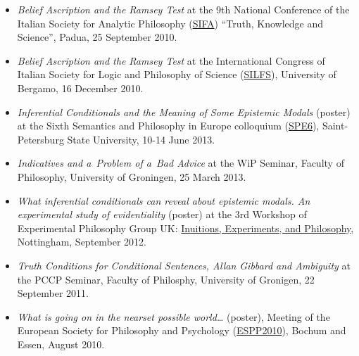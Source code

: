 \documentclass[a4paper,12pt]{article}
\begin{document}
\begin{small}
\begin{itemize}
  \item \emph{Belief Ascription and the Ramsey Test} at the 9th
    National Conference of the Italian Society for Analytic Philosophy
    (\href{http://www.filosofia.lettere.unipd.it/analitica/sifa2010/}{SIFA})
    ``Truth, Knowledge and Science'', Padua, 25 September
    2010. %

    
  \item \emph{Belief Ascription and the Ramsey Test} at the
    International Congress of Italian Society for Logic and Philosophy
    of Science
    (\href{http://dinamico2.unibg.it/silfs/convegno2010.htm}{SILFS}),
    University of Bergamo, 16 December
    2010. %
  \end{itemize}
  

  \begin{itemize}

  \item \emph{Inferential Conditionals and the Meaning of Some
      Epistemic Modals} (poster) at the Sixth Semantics and Philosophy
    in Europe colloquium
    (\href{http://spe6conference.wordpress.com}{SPE6}),
    Saint-Petersburg State University, 10-14 June 2013.
    
  \item \emph{Indicatives and a~Problem of a~Bad Advice} at the WiP
    Seminar, Faculty of Philosophy, University of Groningen, 25 March
    2013.
    
  \item \emph{What inferential conditionals can reveal about epistemic
      modals. An experimental study of evidentiality} (poster) at the
    3rd Workshop of Experimental Philosophy Group UK:
    \href{https://www.nottingham.ac.uk/philosophy/research/conferences/workshop-intuitions-experimentsandphilosophy.aspx}{Inuitions,
      Experiments, and Philosophy}, Nottingham, September 2012.

  \item \emph{Truth Conditions for Conditional Sentences, Allan
      Gibbard and Ambiguity} at the PCCP Seminar, Faculty of
    Philosphy, University of Gronigen, 22 September 2011.
    
  \item \emph{What is going on in the nearset possible world\ldots}
    (poster), Meeting of the European Society for Philosophy and
    Psychology
    (\href{http://www.ruhr-uni-bochum.de/philosophy/espp2010/index.html}{ESPP2010}),
    Bochum and Essen, August 2010.


\end{itemize}
\end{small}
\end{document}
